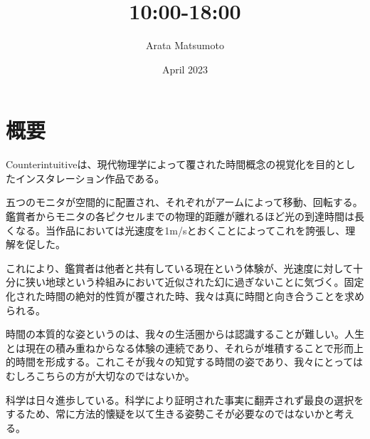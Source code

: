 \documentclass[a4paper]{article}
\title{10:00-18:00}
\author{Arata Matsumoto}
\date{April 2023}
\begin{document}
\maketitle
\section{概要}
Counterintuitiveは、現代物理学によって覆された時間概念の視覚化を目的としたインスタレーション作品である。

五つのモニタが空間的に配置され、それぞれがアームによって移動、回転する。鑑賞者からモニタの各ピクセルまでの物理的距離が離れるほど光の到達時間は長くなる。当作品においては光速度を1m/sとおくことによってこれを誇張し、理解を促した。

これにより、鑑賞者は他者と共有している現在という体験が、光速度に対して十分に狭い地球という枠組みにおいて近似された幻に過ぎないことに気づく。固定化された時間の絶対的性質が覆された時、我々は真に時間と向き合うことを求められる。

時間の本質的な姿というのは、我々の生活圏からは認識することが難しい。人生とは現在の積み重ねからなる体験の連続であり、それらが堆積することで形而上的時間を形成する。これこそが我々の知覚する時間の姿であり、我々にとってはむしろこちらの方が大切なのではないか。

科学は日々進歩している。科学により証明された事実に翻弄されず最良の選択をするため、常に方法的懐疑を以て生きる姿勢こそが必要なのではないかと考える。
\end{document}
